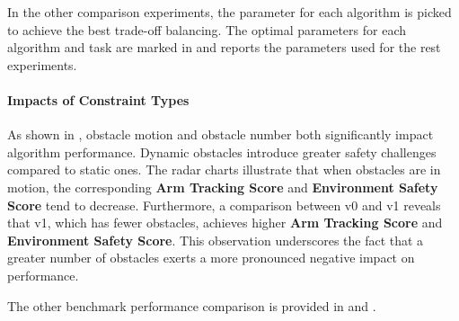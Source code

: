 In the other comparison experiments, the parameter for each algorithm is picked to achieve the best trade-off balancing. The optimal parameters for each algorithm and task are marked in  and  reports the parameters used for the rest experiments.


\paragraph{Impacts of Constraint Types}  


As shown in , obstacle motion and obstacle number both significantly impact algorithm performance. Dynamic obstacles introduce greater safety challenges compared to static ones. The radar charts illustrate that when obstacles are in motion, the corresponding \textbf{Arm Tracking Score} and \textbf{Environment Safety Score} tend to decrease. Furthermore, a comparison between v0 and v1 reveals that v1, which has fewer obstacles, achieves higher \textbf{Arm Tracking Score} and \textbf{Environment Safety Score}. This observation underscores the fact that a greater number of obstacles exerts a more pronounced negative impact on performance.

The other benchmark performance comparison is provided in  and .

